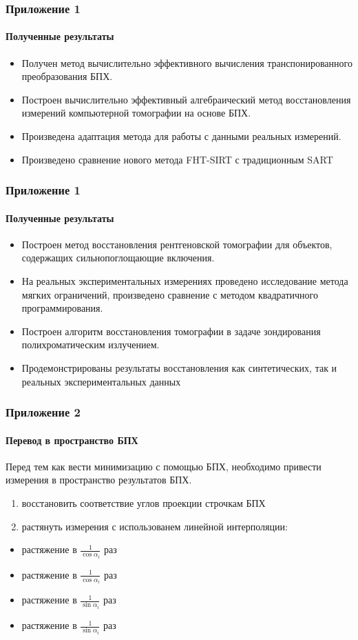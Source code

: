 \documentclass[12pt]{beamer}
\newcommand{\rom}[1]{%
  \textup{\uppercase\expandafter{\romannumeral#1}}%
}
\begin{document}
\appendix

\begin{frame}
\frametitle{Приложение 1}
\framesubtitle{Полученные результаты}
\begin{itemize}
  \item Получен метод вычислительно эффективного вычисления транспонированного преобразования БПХ.
  \item Построен вычислительно эффективный алгебраический метод восстановления измерений компьютерной томографии на основе БПХ.
  \item Произведена адаптация метода для работы с данными реальных измерений. \item Произведено сравнение нового метода FHT-SIRT с традиционным SART
\end{itemize}
\end{frame}

\begin{frame}
\frametitle{Приложение 1}
\framesubtitle{Полученные результаты}
\begin{itemize}
  \item Построен метод восстановления рентгеновской томографии для объектов, содержащих сильнопоглощающие включения. 
  \item На реальных экспериментальных измерениях проведено исследование метода мягких ограничений, произведено сравнение с методом квадратичного программирования.
  \item Построен алгоритм восстановления томографии в задаче зондирования полихроматическим излучением. 
  \item Продемонстрированы результаты восстановления как синтетических, так и реальных экспериментальных данных
\end{itemize}
\end{frame}

\begin{frame}
\frametitle{Приложение 2}
\framesubtitle{Перевод в пространство БПХ}

Перед тем как вести минимизацию с помощью БПХ, необходимо привести измерения в пространство результатов БПХ.
\begin{enumerate}
  \item восстановить соответствие углов проекции строчкам БПХ
  \item растянуть измерения с использованем линейной интерполяции:
\end{enumerate}

\hspace*{2cm}
  \begin{itemize}
    \item \rom{1} растяжение в $\frac 1 {\cos \alpha_i}$ раз
    \item \rom{2} растяжение в $\frac 1 {\cos \alpha_i}$ раз
    \item \rom{3} растяжение в $\frac 1 {\sin \alpha_i}$ раз
    \item \rom{4} растяжение в $\frac 1 {\sin \alpha_i}$ раз
  \end{itemize}

\end{frame}
\end{document}
